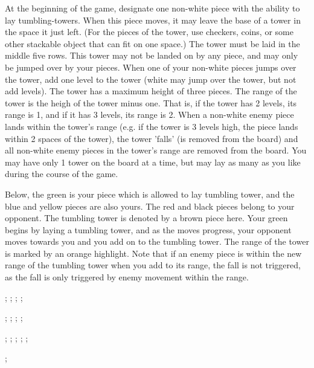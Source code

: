 \documentclass[../rulebook.tex]{subfiles}
\begin{document}
At the beginning of the game,
designate one non-white piece with the ability to lay tumbling-towers.
When this piece moves,
it may leave the base of a tower in the space it just left.
(For the pieces of the tower, use checkers, coins,
or some other stackable object that can fit on one space.)
The tower must be laid in the middle five rows.
This tower may not be landed on by any piece,
and may only be jumped over by your pieces.
When one of your non-white pieces jumps over the tower,
add one level to the tower
(white may jump over the tower, but not add levels).
The tower has a maximum height of three pieces.
The range of the tower is the heigh of the tower minus one.
That is, if the tower has 2 levels, its range is 1,
and if it has 3 levels, its range is 2.
When a non-white enemy piece lands within the tower's range
(e.g. if the tower is 3 levels high, the piece lands within
2 spaces of the tower),
the tower 'falls' (is removed from the board)
and all non-white enemy pieces in the tower's range
are removed from the board. 
You may have only 1 tower on the board at a time,
but may lay as many as you like during the course of the game. 

Below, the green is your piece which is allowed to lay tumbling tower,
and the blue and yellow pieces are also yours.
The red and black pieces belong to your opponent.
The tumbling tower is denoted by a brown piece here.
Your green begins by laying a tumbling tower, and as the moves progress,
your opponent moves towards you and you add on to the tumbling tower.
The range of the tower is marked by an orange highlight.
Note that if an enemy piece is within the new range of the tumbling tower
when you add to its range, the fall is not triggered, as the fall is
only triggered by enemy movement within the range.

\begin{center}
  \begin{struggleboard}
    ;
    ;
    ;
    ;
  \end{struggleboard}
  \begin{struggleboard}
    ;
    ;
    ;
    ;
  \end{struggleboard}
  \begin{struggleboard}
    ;
    ;
    ;
    ;
    ;
  \end{struggleboard}
  \begin{struggleboard}
    ;
  \end{struggleboard}
\end{center}
\end{document}
